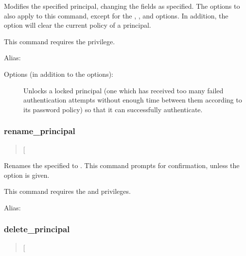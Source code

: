 \documentclass[letterpaper,10pt,english]{sphinxmanual}
\begin{document}
\sphinxAtStartPar
Modifies the specified principal, changing the fields as specified.
The options to  also apply to this command, except
for the , , and  options.  In addition, the
option  will clear the current policy of a principal.

\sphinxAtStartPar
This command requires the  privilege.

\sphinxAtStartPar
Alias: 

\sphinxAtStartPar
Options (in addition to the  options):
\begin{description}
\item[{}] \leavevmode
\sphinxAtStartPar
Unlocks a locked principal (one which has received too many failed
authentication attempts without enough time between them according
to its password policy) so that it can successfully authenticate.

\end{description}


\subsubsection{rename\_principal}
\label{\detokenize{admin/admin_commands/kadmin_local:rename-principal}}\label{\detokenize{admin/admin_commands/kadmin_local:id3}}\begin{quote}

\sphinxAtStartPar
{} {[}\sphinxstylestrong{\sphinxhyphen{}force}{]}  
\end{quote}

\sphinxAtStartPar
Renames the specified  to .  This
command prompts for confirmation, unless the  option is
given.

\sphinxAtStartPar
This command requires the  and  privileges.

\sphinxAtStartPar
Alias: 


\subsubsection{delete\_principal}
\label{\detokenize{admin/admin_commands/kadmin_local:delete-principal}}\label{\detokenize{admin/admin_commands/kadmin_local:id4}}\begin{quote}

\sphinxAtStartPar
{} {[}\sphinxstylestrong{\sphinxhyphen{}force}{]} 
\end{quote}
\end{document}
